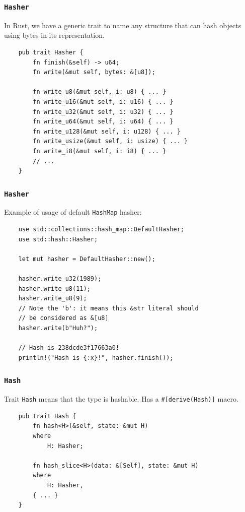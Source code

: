\documentclass[aspectratio=1610,t]{beamer}
\begin{document}

\begin{frame}[fragile]
\frametitle{\texttt{Hasher}}
In Rust, we have a generic trait to name any structure that can hash objects using bytes in its representation.

\begin{verbatim}
    pub trait Hasher {
        fn finish(&self) -> u64;
        fn write(&mut self, bytes: &[u8]);

        fn write_u8(&mut self, i: u8) { ... }
        fn write_u16(&mut self, i: u16) { ... }
        fn write_u32(&mut self, i: u32) { ... }
        fn write_u64(&mut self, i: u64) { ... }
        fn write_u128(&mut self, i: u128) { ... }
        fn write_usize(&mut self, i: usize) { ... }
        fn write_i8(&mut self, i: i8) { ... }
        // ...
    }
\end{verbatim}
\end{frame}


\begin{frame}[fragile]
\frametitle{\texttt{Hasher}}
Example of usage of default \texttt{HashMap} hasher:

\begin{verbatim}
    use std::collections::hash_map::DefaultHasher;
    use std::hash::Hasher;

    let mut hasher = DefaultHasher::new();

    hasher.write_u32(1989);
    hasher.write_u8(11);
    hasher.write_u8(9);
    // Note the 'b': it means this &str literal should
    // be considered as &[u8]
    hasher.write(b"Huh?");

    // Hash is 238dcde3f17663a0!
    println!("Hash is {:x}!", hasher.finish());
\end{verbatim}
\end{frame}


\begin{frame}[fragile]
\frametitle{\texttt{Hash}}
Trait \texttt{Hash} means that the type is hashable. Has a \texttt{\#[derive(Hash)]} macro.

\begin{verbatim}
    pub trait Hash {
        fn hash<H>(&self, state: &mut H)
        where
            H: Hasher;

        fn hash_slice<H>(data: &[Self], state: &mut H)
        where
            H: Hasher,
        { ... }
    }
\end{verbatim}
\end{frame}
\end{document}
